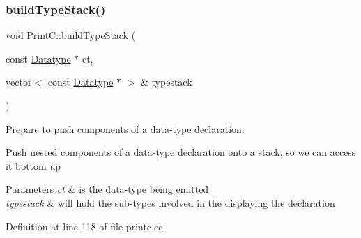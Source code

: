 \subsubsection{\texorpdfstring{buildTypeStack()}{buildTypeStack()}}
{\footnotesize\ttfamily void Print\+C\+::build\+Type\+Stack (\begin{DoxyParamCaption}\item[{const \mbox{\hyperlink{class_datatype}{Datatype}} $\ast$}]{ct,  }\item[{vector$<$ const \mbox{\hyperlink{class_datatype}{Datatype}} $\ast$ $>$ \&}]{typestack }\end{DoxyParamCaption})\hspace{0.3cm}{\ttfamily [protected]}}



Prepare to push components of a data-\/type declaration. 

Push nested components of a data-\/type declaration onto a stack, so we can access it bottom up 
\begin{DoxyParams}{Parameters}
{\em ct} & is the data-\/type being emitted \\
\hline
{\em typestack} & will hold the sub-\/types involved in the displaying the declaration \\
\hline
\end{DoxyParams}


Definition at line 118 of file printc.\+cc.

